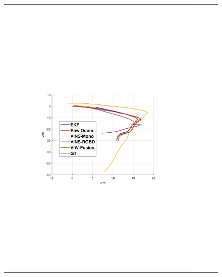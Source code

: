 \documentclass[conference]{IEEEtran}
\begin{document}
\begin{figure}
\begin{center}
\begin{tabular}{cccc}
				
				\includegraphics[scale=0.26]{fig/slope1.pdf} &

\end{tabular}
\end{center}
\end{figure}
\end{document}
